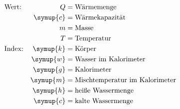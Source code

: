 \begin{align*}
      &\text{Wert:} &Q &= \text{Wärmemenge} \\
      &             &\symup{c} &= \text{Wärmekapazität} \\
      &             &m &= \text{Masse} \\
      &             &T &= \text{Temperatur} \\
      &\text{Index:} &\symup{k} &= \text{Körper} \\
      &              &\symup{w} &= \text{Wasser im Kalorimeter} \\
      &              &\symup{g} &= \text{Kalorimeter} \\
      &              &\symup{m} &= \text{Mischtemperatur im Kalorimeter} \\
      &              &\symup{h} &= \text{heiße Wassermenge} \\
      &              &\symup{c} &= \text{kalte Wassermenge}
\end{align*}
